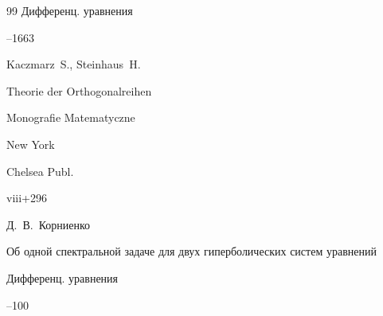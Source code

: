 \begin{thebibliography}{99}
\jour Дифференц. уравнения




--1663

















\by Kaczmarz~S., Steinhaus~H.

\book Theorie der Orthogonalreihen


\serial Monografie Matematyczne 


\publaddr New York

\publ Chelsea Publ. 

\totalpages viii+296 





\by Д.~В.~Корниенко

\paper Об одной спектральной задаче для двух гиперболических систем уравнений

\jour Дифференц. уравнения




--100




























\end{thebibliography}





